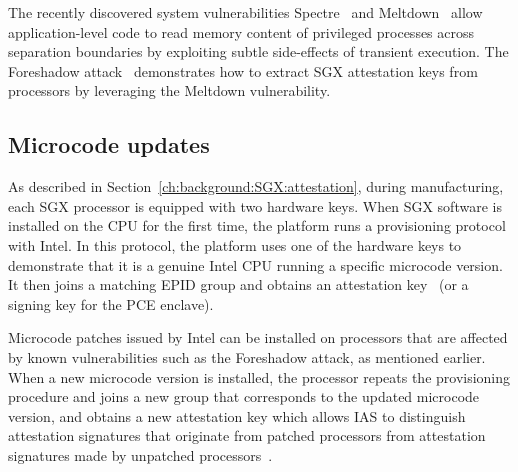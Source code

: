 The recently discovered system vulnerabilities Spectre~\cite{Kocher2018spectre} and Meltdown~\cite{Lipp2018meltdown} allow application-level code to read memory content of privileged processes across separation boundaries by exploiting subtle side-effects of transient execution. The Foreshadow attack~\cite{foreshadow-usenix18} demonstrates how to extract SGX attestation keys from processors by leveraging the Meltdown vulnerability. 

\subsection{Microcode updates}
As described in Section~\ref{ch:background:SGX:attestation}, during manufacturing, each SGX processor is equipped with two hardware keys. When SGX software is installed on the CPU for the first time, the platform runs a provisioning protocol with Intel. In this protocol, the platform uses one of the hardware keys to demonstrate that it is a genuine Intel CPU running a specific microcode version. It then joins a matching EPID group and obtains an attestation key~\cite{epid_attestation} (or a signing key for the PCE enclave). 

Microcode patches issued by Intel can be installed on processors that are affected by known vulnerabilities such as the Foreshadow attack, as mentioned earlier. When a new microcode version is installed, the processor repeats the provisioning procedure and joins a new group that corresponds to the updated microcode version, and obtains a new attestation key which allows IAS to distinguish attestation signatures that originate from patched processors from attestation signatures made by unpatched processors~\cite{epid_attestation}.